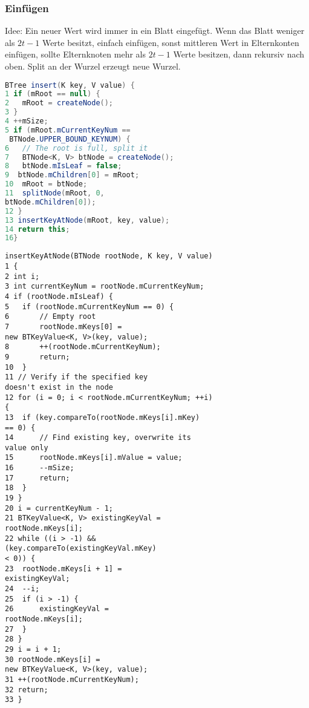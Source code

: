 \documentclass[jou,apacite]{apa6}
\begin{document}
\subsubsection{Einfügen}
Idee: Ein neuer Wert wird immer in ein Blatt eingefügt. Wenn das Blatt weniger als $2t-1$ Werte besitzt, einfach einfügen, sonst mittleren Wert in Elternkonten einfügen, sollte Elternknoten mehr als $2t-1$ Werte besitzen, dann rekursiv nach oben. Split an der Wurzel erzeugt neue Wurzel.
\begin{lstlisting}[language=java]
BTree insert(K key, V value) {
1 if (mRoot == null) {
2   mRoot = createNode();
3 }
4 ++mSize;
5 if (mRoot.mCurrentKeyNum ==
 BTNode.UPPER_BOUND_KEYNUM) {
6   // The root is full, split it
7   BTNode<K, V> btNode = createNode();
8   btNode.mIsLeaf = false;
9  btNode.mChildren[0] = mRoot;
10  mRoot = btNode;
11  splitNode(mRoot, 0,
btNode.mChildren[0]);
12 }
13 insertKeyAtNode(mRoot, key, value);
14 return this;
16}
\end{lstlisting}
\begin{lstlisting}
insertKeyAtNode(BTNode rootNode, K key, V value)
1 {
2 int i;
3 int currentKeyNum = rootNode.mCurrentKeyNum;
4 if (rootNode.mIsLeaf) {
5   if (rootNode.mCurrentKeyNum == 0) {
6       // Empty root
7       rootNode.mKeys[0] = 
new BTKeyValue<K, V>(key, value);
8       ++(rootNode.mCurrentKeyNum);
9       return;
10  }
11 // Verify if the specified key 
doesn't exist in the node
12 for (i = 0; i < rootNode.mCurrentKeyNum; ++i)
{
13  if (key.compareTo(rootNode.mKeys[i].mKey)
== 0) {
14      // Find existing key, overwrite its
value only
15      rootNode.mKeys[i].mValue = value;
16      --mSize;
17      return;
18  }
19 }
20 i = currentKeyNum - 1;
21 BTKeyValue<K, V> existingKeyVal =
rootNode.mKeys[i];
22 while ((i > -1) &&
(key.compareTo(existingKeyVal.mKey) 
< 0)) {
23  rootNode.mKeys[i + 1] = 
existingKeyVal;
24  --i;
25  if (i > -1) {
26      existingKeyVal =
rootNode.mKeys[i];
27  }
28 }
29 i = i + 1;
30 rootNode.mKeys[i] = 
new BTKeyValue<K, V>(key, value);
31 ++(rootNode.mCurrentKeyNum);
32 return;
33 }
\end{lstlisting}
\end{document}
